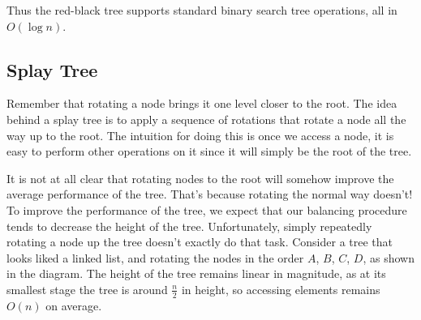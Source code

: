 \documentclass[11pt]{book}
\begin{document}
Thus the red-black tree supports standard binary search tree operations, all in $O(\log{n})$.

\subsection{Splay Tree}

Remember that rotating a node brings it one level closer to the root. The idea behind a splay tree is to apply a sequence of rotations that rotate a node all the way up to the root. The intuition for doing this is once we access a node, it is easy to perform other operations on it since it will simply be the root of the tree.

It is not at all clear that rotating nodes to the root will somehow improve the average performance of the tree. That's because rotating the normal way doesn't! To improve the performance of the tree, we expect that our balancing procedure tends to decrease the height of the tree. Unfortunately, simply repeatedly rotating a node up the tree doesn't exactly do that task. Consider a tree that looks liked a linked list, and rotating the nodes in the order $A$, $B$, $C$, $D$, as shown in the diagram. The height of the tree remains linear in magnitude, as at its smallest stage the tree is around $\frac{n}{2}$ in height, so accessing elements remains $O(n)$ on average.
\end{document}
